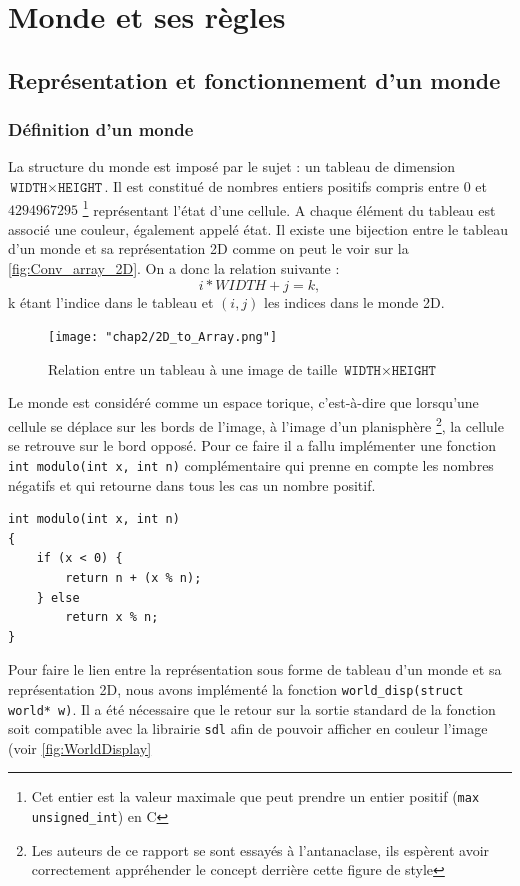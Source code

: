 \chapter{Monde et ses règles}
\section{Représentation et fonctionnement d'un monde}
\subsection{Définition d'un monde}
La structure du monde est imposé par le sujet : un tableau de dimension $\texttt{WIDTH} \times \texttt{HEIGHT}$. Il est constitué de nombres entiers positifs compris entre $0$ et $4294967295$ \footnote{Cet entier est la valeur maximale que peut prendre un entier positif (\lstinline{max unsigned_int}) en C} représentant l'état d'une cellule. A chaque élément du tableau est associé une couleur, également appelé état. Il existe une bijection entre le tableau d'un monde et sa représentation 2D comme on peut le voir sur la \autoref{fig:Conv_array_2D}. On a donc la relation suivante : $$i* WIDTH + j = k ,$$ k étant l'indice dans le tableau et $(i,j)$ les indices dans le monde 2D.

\begin{figure}[ht!]
    \centering
    \texttt{[image: "chap2/2D\_to\_Array.png"]}
    \caption{Relation entre un tableau à une image de taille $\texttt{WIDTH}\times\texttt{HEIGHT}$}
    \label{fig:Conv_array_2D}
\end{figure}

Le monde est considéré comme un espace torique, c'est-à-dire que lorsqu'une cellule se déplace sur les bords de l'image, à l'image d'un planisphère \footnote{Les auteurs de ce rapport se sont essayés à l'antanaclase, ils espèrent avoir correctement appréhender le concept derrière cette figure de style}, la cellule se retrouve sur le bord opposé. Pour ce faire il a fallu implémenter une fonction \lstinline{int modulo(int x, int n)} complémentaire qui prenne en compte les nombres négatifs et qui retourne dans tous les cas un nombre positif.
\begin{lstlisting}
int modulo(int x, int n)
{
    if (x < 0) {
        return n + (x % n);
    } else
        return x % n;
}
\end{lstlisting}

Pour faire le lien entre la représentation sous forme de tableau d'un monde et sa représentation 2D, nous avons implémenté la fonction \lstinline{world_disp(struct world* w)}. Il a été nécessaire que le retour sur la sortie standard de la fonction soit compatible avec la librairie \texttt{sdl} afin de pouvoir afficher en couleur l'image (voir \autoref{fig:WorldDisplay}

